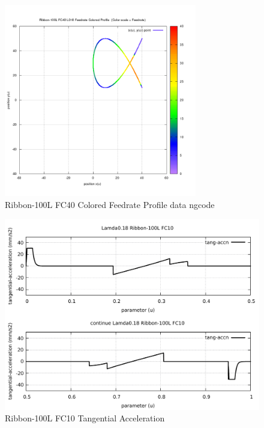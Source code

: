 \begin{figure}
	\caption     {Ribbon-100L FC40 Colored Feedrate Profile data ngcode}
	\label{20-img-Ribbon-100L-FC40-Colored-Feedrate-Profile-data_ngcode.png}
\includegraphics[width=0.75\textwidth]{Chap4/appendix/app-Ribbon-100L/plots/20-img-Ribbon-100L-FC40-Colored-Feedrate-Profile-data_ngcode.png}
\end{figure}

\clearpage
\pagebreak

\begin{figure}
	\caption     {Ribbon-100L FC10 Tangential Acceleration}
	\label{21-img-Ribbon-100L-FC10-Tangential-Acceleration.pdf}
\includegraphics[width=1.00\textwidth]{Chap4/appendix/app-Ribbon-100L/plots/21-img-Ribbon-100L-FC10-Tangential-Acceleration.pdf}
\end{figure}



